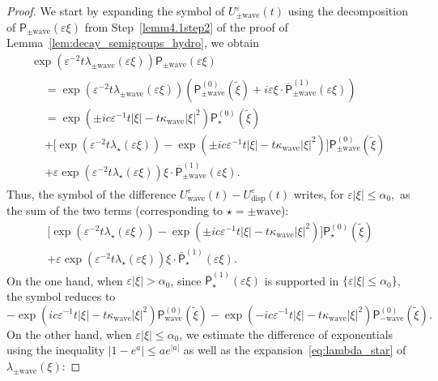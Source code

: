 \documentclass[10pt]{amsart}
\theoremstyle{definition}\newtheorem{defi}[theo]{Definition}\newtheorem{rema}[theo]{Remark}\newtheorem{exam}[theo]{Example}\newtheorem{exem}[theo]{Example}\newtheorem{nota}[theo]{Notation}
\newcommand{\Wave}{\mathrm{wave}}
\newcommand{\disp}{\mathrm{disp}}
\newcommand{\PP}{\mathsf{P}}
\renewcommand*\le{\leqslant}
\newcommand*\eps{{\varepsilon}}
\begin{document}
\begin{proof}
We start by expanding the symbol of $U^\eps_{\pm \Wave}(t)$ using the decomposition of $\PP_{\pm \Wave}(\eps \xi)$ from Step~\ref{lemm4.1step2} of the proof of Lemma~\ref{lem:decay_semigroups_hydro}, we obtain
\begin{multline*}
\exp\left(\eps^{-2} t \lambda_{\pm \Wave}(\eps \xi) \right)\PP_{\pm \Wave}(\eps \xi)\\
\begin{aligned}
&= \exp\left(\eps^{-2} t \lambda_{\pm \Wave}(\eps \xi) \right)\left(\PP_{\pm \Wave}^{(0)}\left(\widetilde{\xi} \right) + i\eps \xi \cdot \overline{\PP}^{(1)}_{\pm \Wave}(\eps \xi) \right)\\
&=  \exp\left(\pm i c \eps^{-1}t| \xi | - t \kappa_\Wave | \xi |^2 \right) \PP_{\star}^{(0)}\left(\widetilde{\xi} \right) \\
& + \Bigg[\exp\left(\eps^{-2} t \lambda_{\star}(\eps \xi) \right) - \exp\left(\pm i c \eps^{-1}t| \xi | - t \kappa_\Wave | \xi |^2 \right) \Bigg] \PP_{\pm \Wave}^{(0)}\left(\widetilde{\xi} \right) \\
& + \eps \exp\left(\eps^{-2} t \lambda_{\star}(\eps \xi) \right) \xi \cdot \overline{\PP}^{(1)}_{\pm \Wave}(\eps \xi).
\end{aligned}
\end{multline*}
Thus, the symbol of the difference $U^\eps_\Wave(t) - U^\eps_\disp(t)$ writes, for $\eps |\xi| \le \alpha_{0},$ as the sum of the two terms (corresponding to $\star=\pm\Wave$):
\begin{multline*}
\Big[\exp\left(\eps^{-2} t \lambda_{\star}(\eps \xi) \right) - \exp\left(\pm i c \eps^{-1}t | \xi | - t \kappa_\Wave | \xi |^2 \right) \Big] \PP_{\star}^{(0)}\left(\widetilde{\xi} \right)\\
+ \eps \exp\left(\eps^{-2} t \lambda_{\star}(\eps \xi) \right) \xi \cdot \overline{\PP}^{(1)}_{\star}(\eps \xi).
\end{multline*}
On the one hand, when $\eps |\xi| > \alpha_{0}$, since $\overline{\PP}^{(1)}_{\star}(\eps \xi)$ is supported in $\{ \eps |\xi | \le \alpha_{0} \}$, the symbol reduces to
\[
- \exp\left(i c \eps^{-1}t | \xi | - t \kappa_\Wave | \xi |^2 \right) \PP_\Wave^{(0)}\left(\widetilde{\xi} \right)-\exp\left(- i c \eps^{-1}t | \xi | - t \kappa_\Wave | \xi |^2 \right) \PP_{-\Wave}^{(0)}\left(\widetilde{\xi} \right).
\]
On the other hand, when $\eps | \xi | \le \alpha_{0}$, we estimate the difference of exponentials using the inequality $|1 - e^a| \le a e^{|a|}$ as well as the expansion~\eqref{eq:lambda_star} of $\lambda_{\pm\Wave}(\xi)$:

\end{proof}
\end{document}
